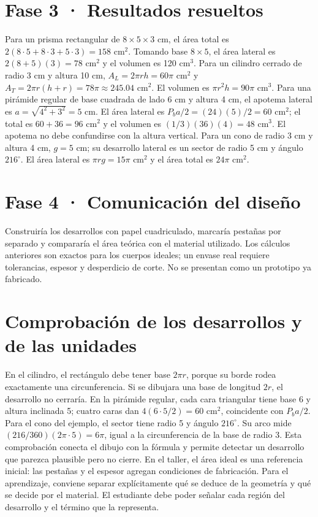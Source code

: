 \documentclass[spanish,letterpaper,oneside]{article}
\begin{document}
\section{Fase 3 · Resultados resueltos}
Para un prisma rectangular de $8\times5\times3$ cm, el área total es $2(8\cdot5+8\cdot3+5\cdot3)=158$ cm$^2$. Tomando base $8\times5$, el área lateral es $2(8+5)(3)=78$ cm$^2$ y el volumen es 120 cm$^3$.
Para un cilindro cerrado de radio 3 cm y altura 10 cm, $A_L=2\pi rh=60\pi$ cm$^2$ y $A_T=2\pi r(h+r)=78\pi\approx245.04$ cm$^2$. El volumen es $\pi r^2h=90\pi$ cm$^3$.
Para una pirámide regular de base cuadrada de lado 6 cm y altura 4 cm, el apotema lateral es $a=\sqrt{4^2+3^2}=5$ cm. El área lateral es $P_ba/2=(24)(5)/2=60$ cm$^2$; el total es $60+36=96$ cm$^2$ y el volumen es $(1/3)(36)(4)=48$ cm$^3$. El apotema no debe confundirse con la altura vertical.
Para un cono de radio 3 cm y altura 4 cm, $g=5$ cm; su desarrollo lateral es un sector de radio 5 cm y ángulo $216^\circ$. El área lateral es $\pi rg=15\pi$ cm$^2$ y el área total es $24\pi$ cm$^2$.
\section{Fase 4 · Comunicación del diseño}
Construiría los desarrollos con papel cuadriculado, marcaría pestañas por separado y compararía el área teórica con el material utilizado. Los cálculos anteriores son exactos para los cuerpos ideales; un envase real requiere tolerancias, espesor y desperdicio de corte. No se presentan como un prototipo ya fabricado.
\section{Comprobación de los desarrollos y de las unidades}
En el cilindro, el rectángulo debe tener base $2\pi r$, porque su borde rodea exactamente una circunferencia. Si se dibujara una base de longitud $2r$, el desarrollo no cerraría. En la pirámide regular, cada cara triangular tiene base 6 y altura inclinada 5; cuatro caras dan $4(6\cdot5/2)=60$ cm$^2$, coincidente con $P_ba/2$.
Para el cono del ejemplo, el sector tiene radio 5 y ángulo $216^\circ$. Su arco mide $(216/360)(2\pi\cdot5)=6\pi$, igual a la circunferencia de la base de radio 3. Esta comprobación conecta el dibujo con la fórmula y permite detectar un desarrollo que parezca plausible pero no cierre.
En el taller, el área ideal es una referencia inicial: las pestañas y el espesor agregan condiciones de fabricación. Para el aprendizaje, conviene separar explícitamente qué se deduce de la geometría y qué se decide por el material. El estudiante debe poder señalar cada región del desarrollo y el término que la representa.
\end{document}
